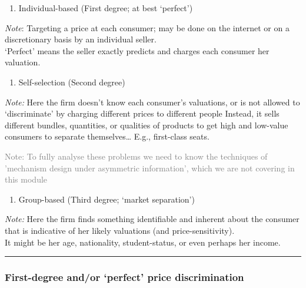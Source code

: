\documentclass[]{article}
\providecommand{\tightlist}{%
  \setlength{\itemsep}{0pt}\setlength{\parskip}{0pt}}
\begin{document}
\begin{enumerate}
\def\labelenumi{\arabic{enumi}.}
\tightlist
\item
  Individual-based (First degree; at best `perfect')
\end{enumerate}

\emph{Note}: Targeting a price at each consumer; may be done on the
internet or on a discretionary basis by an individual seller.\\
`Perfect' means the seller exactly predicts and charges each consumer
her valuation.

\bigskip

\begin{enumerate}
\def\labelenumi{\arabic{enumi}.}
\setcounter{enumi}{1}
\tightlist
\item
  Self-selection (Second degree)
\end{enumerate}

\emph{Note:} Here the firm doesn't know each consumer's valuations, or
is not allowed to `discriminate' by charging different prices to
different people Instead, it sells different bundles, quantities, or
qualities of products to get high and low-value consumers to separate
themselves\ldots{} E.g., first-class seats.

\bigskip

\textcolor{gray}{Note: To fully analyse these problems we need to know the techniques of 'mechanism design under asymmetric information', which we are not covering in this module}

\bigskip

\begin{enumerate}
\def\labelenumi{\arabic{enumi}.}
\setcounter{enumi}{2}
\tightlist
\item
  Group-based (Third degree; `market separation')
\end{enumerate}

\emph{Note:} Here the firm finds something identifiable and inherent
about the consumer\\
that is indicative of her likely valuations (and price-sensitivity).\\
It might be her age, nationality, student-status, or even perhaps her
income.

\begin{center}\rule{0.5\linewidth}{\linethickness}\end{center}

\hypertarget{first-degree-andor-perfect-price-discrimination}{%
\subsubsection{First-degree and/or `perfect' price
discrimination}\label{first-degree-andor-perfect-price-discrimination}}
\end{document}
